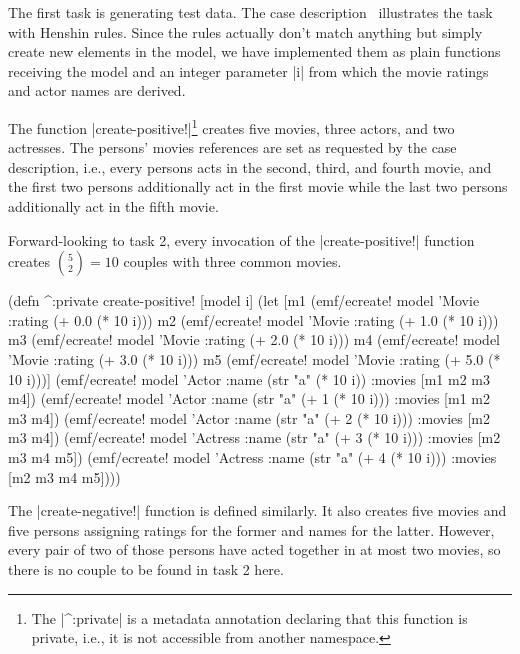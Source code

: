 \documentclass[a4paper]{article}
\newcommand{\code}{\clojureinline}
\begin{document}
The first task is generating test data.  The case
description~\cite{movies-case-desc} illustrates the task with Henshin rules.
Since the rules actually don't match anything but simply create new elements in
the model, we have implemented them as plain functions receiving the model and
an integer parameter \code|i| from which the movie ratings and actor names are
derived.

The function \code|create-positive!|\footnote{The \code|^:private| is a
  metadata annotation declaring that this function is private, i.e., it is not
  accessible from another namespace.} creates five movies, three actors, and
two actresses.  The persons' \textsf{movies} references are set as requested by
the case description, i.e., every persons acts in the second, third, and fourth
movie, and the first two persons additionally act in the first movie while the
last two persons additionally act in the fifth movie.

Forward-looking to task 2, every invocation of the \code|create-positive!|
function creates \({5 \choose 2} = 10\) couples with three common movies.

\begin{clojurecode}
(defn ^:private create-positive! [model i]
  (let [m1 (emf/ecreate! model 'Movie :rating (+ 0.0 (* 10 i)))
        m2 (emf/ecreate! model 'Movie :rating (+ 1.0 (* 10 i)))
        m3 (emf/ecreate! model 'Movie :rating (+ 2.0 (* 10 i)))
        m4 (emf/ecreate! model 'Movie :rating (+ 3.0 (* 10 i)))
        m5 (emf/ecreate! model 'Movie :rating (+ 5.0 (* 10 i)))]
    (emf/ecreate! model 'Actor   :name (str "a" (* 10 i))       :movies [m1 m2 m3 m4])
    (emf/ecreate! model 'Actor   :name (str "a" (+ 1 (* 10 i))) :movies [m1 m2 m3 m4])
    (emf/ecreate! model 'Actor   :name (str "a" (+ 2 (* 10 i))) :movies [m2 m3 m4])
    (emf/ecreate! model 'Actress :name (str "a" (+ 3 (* 10 i))) :movies [m2 m3 m4 m5])
    (emf/ecreate! model 'Actress :name (str "a" (+ 4 (* 10 i))) :movies [m2 m3 m4 m5])))
\end{clojurecode}

The \code|create-negative!| function is defined similarly.  It also creates
five movies and five persons assigning ratings for the former and names for the
latter.  However, every pair of two of those persons have acted together in at
most two movies, so there is no couple to be found in task 2 here.
\end{document}
